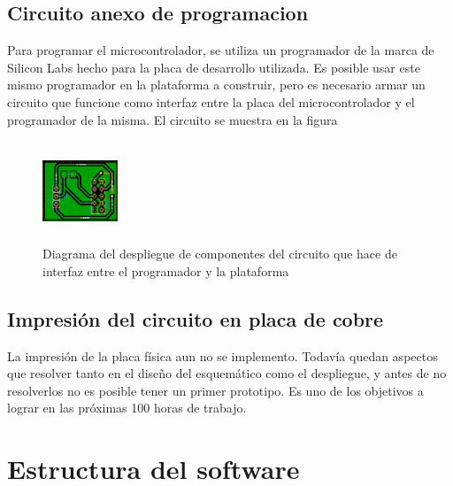 \documentclass{article}
\theoremstyle{definition}
\theoremstyle{remark}
\begin{document}

\subsection{Circuito anexo de programacion} %
\label{sub:circuito_anexo_de_programacion}

Para programar el microcontrolador, se utiliza un programador de la marca de Silicon Labs hecho para la placa de desarrollo utilizada. Es posible usar este mismo programador en la plataforma a construir, pero es necesario armar un circuito que funcione como interfaz entre la placa del microcontrolador y el programador de la misma. El circuito se muestra en la figura

\begin{figure}[h]
  \centering
  \includegraphics[width=0.20\textwidth, height = 3cm]{PCB2}
  \caption{\small Diagrama del despliegue de componentes del circuito que hace de interfaz entre el programador y la plataforma}\label{fig:PCB2}
\end{figure}


\subsection{Impresión del circuito en placa de cobre} %
\label{sub:impresion_del_circuito_en_placa_de_cobre}

La impresión de la placa física aun no se implemento. Todavía quedan aspectos que resolver tanto en el diseño del esquemático como el despliegue, y antes de no resolverlos no es posible tener un primer prototipo. Es uno de los objetivos a lograr en las próximas 100 horas de trabajo.





\section{Estructura del software} %
\label{sec:estructura_del_software}
\end{document}
